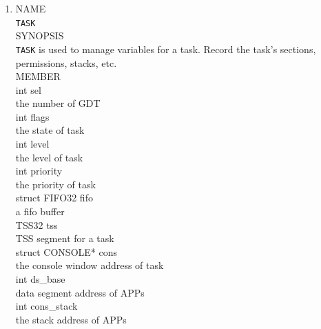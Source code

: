 \documentclass{swfcthesis}
\begin{document}
\begin{enumerate}
  \item
  NAME \\
  \hspace*{1cm}\texttt{TASK} \\
  SYNOPSIS \\
  \hspace*{1cm} \texttt{TASK} is used to manage variables for a task. Record the task's sections, permissions, stacks, etc.\\
  MEMBER \\
  \hspace*{1cm} int sel\\
  \hspace*{1.5cm}   the number of GDT\\
  \hspace*{1cm} int flags\\
  \hspace*{1.5cm} the state of task\\
  \hspace*{1cm} int level\\
  \hspace*{1.5cm} the level of task\\
  \hspace*{1cm} int priority\\
  \hspace*{1.5cm} the priority of task\\
  \hspace*{1cm} struct FIFO32 fifo\\
  \hspace*{1.5cm} a fifo buffer\\
  \hspace*{1cm} TSS32 tss\\
  \hspace*{1.5cm}  TSS segment for a task\\
  \hspace*{1cm} struct CONSOLE* cons\\
  \hspace*{1.5cm} the console window address of task\\
  \hspace*{1cm} int ds\_base\\
  \hspace*{1.5cm}  data segment address of APPs\\
  \hspace*{1cm} int cons\_stack\\
  \hspace*{1.5cm}  the stack address of APPs\\

\end{enumerate}
\end{document}
